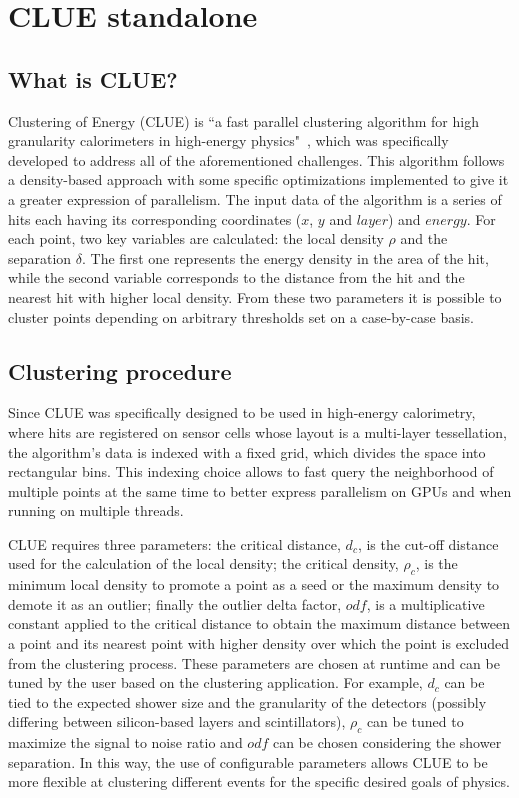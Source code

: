 \section{CLUE standalone}
\subsection{What is CLUE?}
\label{ch:clue}
Clustering of Energy (CLUE) is ``a fast parallel clustering algorithm for high granularity calorimeters in high-energy physics"~\cite{CLUE}, which was specifically developed to address all of the aforementioned challenges. This algorithm follows a density-based approach with some specific optimizations implemented to give it a greater expression of parallelism. The input data of the algorithm is a series of hits each having its corresponding coordinates ($x$, $y$ and $layer$) and $energy$. For each point, two key variables are calculated: the local density $\rho$ and the separation $\delta$. The first one represents the energy density in the area of the hit, while the second variable corresponds to the distance from the hit and the nearest hit with higher local density. From these two parameters it is possible to cluster points depending on arbitrary thresholds set on a case-by-case basis. 

\subsection{Clustering procedure}
\label{ch:clustering_procedure}
Since CLUE was specifically designed to be used in high-energy calorimetry, where hits are registered on sensor cells whose layout is a multi-layer tessellation, the algorithm's data is indexed with a fixed grid, which divides the space into rectangular bins. This indexing choice allows to fast query the neighborhood of multiple points at the same time to better express parallelism on GPUs and when running on multiple threads.

CLUE requires three parameters: the critical distance, $d_c$, is the cut-off distance used for the calculation of the local density; the critical density, $\rho_c$, is the minimum local density to promote a point as a seed or the maximum density to demote it as an outlier; finally the outlier delta factor, $odf$, is a multiplicative constant applied to the critical distance to obtain the maximum distance between a point and its nearest point with higher density over which the point is excluded from the clustering process. These parameters are chosen at runtime and can be tuned by the user based on the clustering application. For example, $d_c$ can be tied to the expected shower size and the granularity of the detectors (possibly differing between silicon-based layers and scintillators), $\rho_c$ can be tuned to maximize the signal to noise ratio and $odf$ can be chosen considering the shower separation. In this way, the use of configurable parameters allows CLUE to be more flexible at clustering different events for the specific desired goals of physics. 

